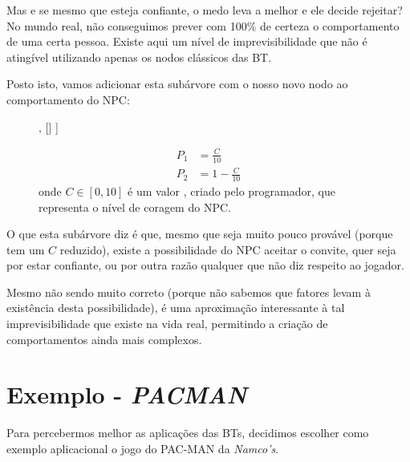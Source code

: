 {    Mas e se mesmo que esteja confiante, o medo leva a melhor e ele decide rejeitar?
    No mundo real, não conseguimos prever com 100\% de certeza o comportamento de uma certa pessoa.
    Existe aqui um nível de imprevisibilidade que não é atingível utilizando apenas os nodos clássicos das BT.

    Posto isto, vamos adicionar esta subárvore com o nosso novo nodo ao comportamento do NPC:

    \begin{figure}[H]
    \centering
        \begin{behavior}
            [\probselector
                [\probnodeaction{$P_1$}{Accept}],
                []
            ]
        \end{behavior}
        
        \begin{align*}
            P_1 &= \frac{C}{10} \\
            P_2 &= 1 - \frac{C}{10}
        \end{align*}
        onde $C \in [0,10]$ é um valor , criado pelo programador, que representa o nível de coragem do NPC.
    \end{figure}
    
    O que esta subárvore diz é que, mesmo que seja muito pouco provável (porque tem um $C$ reduzido), existe a possibilidade do NPC aceitar o convite, quer seja por estar confiante, ou por outra razão qualquer que não diz respeito ao jogador.

    Mesmo não sendo muito correto (porque não sabemos que fatores levam à existência desta possibilidade), é uma aproximação interessante à tal imprevisibilidade que existe na vida real, permitindo a criação de comportamentos ainda mais complexos.

}






\section{Exemplo - \textit{PACMAN}}

Para percebermos melhor as aplicações das BTs, decidimos escolher como exemplo aplicacional o jogo do PAC-MAN da \textit{Namco’s}. 

